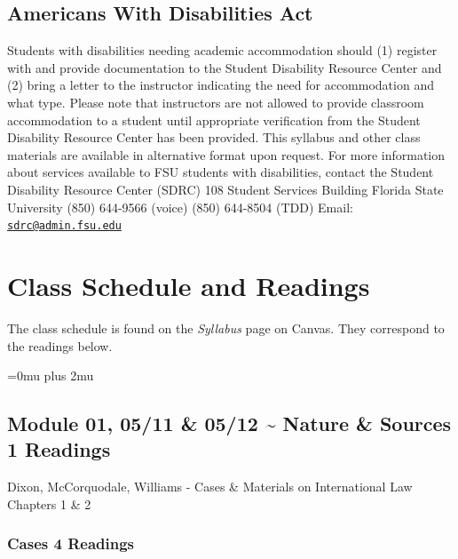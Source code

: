 \documentclass[10pt,]{article}
\begin{document}
\hypertarget{americans-with-disabilities-act}{%
\subsection{Americans With Disabilities
Act}\label{americans-with-disabilities-act}}

Students with disabilities needing academic accommodation should (1)
register with and provide documentation to the Student Disability
Resource Center and (2) bring a letter to the instructor indicating the
need for accommodation and what type. Please note that instructors are
not allowed to provide classroom accommodation to a student until
appropriate verification from the Student Disability Resource Center has
been provided. This syllabus and other class materials are available in
alternative format upon request. For more information about services
available to FSU students with disabilities, contact the Student
Disability Resource Center (SDRC) 108 Student Services Building
\textbar{} Florida State University \textbar{} (850) 644-9566 (voice)
\textbar{} (850) 644-8504 (TDD) \textbar{} Email:
\href{mailto:sdrc@admin.fsu.edu}{\nolinkurl{sdrc@admin.fsu.edu}}

\newpage

\hypertarget{class-schedule-and-readings}{%
\section{Class Schedule and
Readings}\label{class-schedule-and-readings}}

The class schedule is found on the \emph{Syllabus} page on Canvas. They
correspond to the readings below.

\Urlmuskip=0mu plus 2mu

\hypertarget{module-01-0511-0512-nature-sources-1-readings}{%
\subsection{Module 01, 05/11 \& 05/12 \textasciitilde{} Nature \&
Sources \textbar{} 1
Readings}\label{module-01-0511-0512-nature-sources-1-readings}}

Dixon, McCorquodale, Williams - Cases \& Materials on International Law
Chapters 1 \& 2

\hypertarget{cases-4-readings}{%
\subsubsection{Cases \textbar{} 4 Readings}\label{cases-4-readings}}
\end{document}

